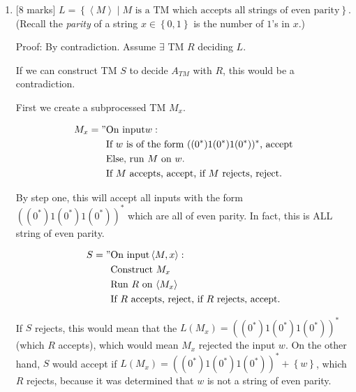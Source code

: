 \documentclass{article}
\newcommand{\set}[1]{{\left\{#1\right\}}}    %
\newcommand{\enc}[1]{\left<#1\right>}
\begin{document}
\begin{enumerate}
\begin{enumerate}
            \item {[8 marks]} $L=\set{\enc{M}\mid M\text{ is a TM which accepts all strings of even parity}}$. (Recall the \emph{parity} of a string $x\in\set{0,1}$ is the number of $1$'s in $x$.)



            		Proof: By contradiction. Assume $\exists$ TM $R$ deciding $L$.

                    If we can construct TM $S$ to decide $A_{TM}$ with $R$, this would be a contradiction.

                    First we create a subprocessed TM $M_x$.

                    \begin{equation}
                        \begin{split}
                           M_x = "& \text{On input} w: \\
                                & \text{If $w$ is of the form $((0^*)1(0^*)1(0^*))^*$, accept} \\
                                & \text{Else, run $M$ on $w$.} \\
                                & \text{If $M$ accepts, accept, if $M$ rejects, reject.}
                        \end{split}
                    \end{equation}

                    By step one, this will accept all inputs with the form $((0^*)1(0^*)1(0^*))^*$ which are all of even parity. In fact, this is ALL string of even parity.

                    \begin{equation}
                        \begin{split}
                           S = "& \text{On input} \enc{M,x}: \\
                                & \text{Construct $M_x$} \\
                                & \text{Run $R$ on $\enc{M_x}$} \\
                                & \text{If $R$ accepts, reject, if $R$ rejects, accept.}
                        \end{split}
                    \end{equation}

                    If $S$ rejects, this would mean that the $L(M_x) = ((0^*)1(0^*)1(0^*))^*$ (which $R$ accepts), which would mean $M_x$ rejected the input $w$. On the other hand, $S$ would accept if $L(M_x) = ((0^*)1(0^*)1(0^*))^* + \set{w}$, which $R$ rejects, because it was determined that $w$ is not a string of even parity.


\end{enumerate}
\end{enumerate}
\end{document}
